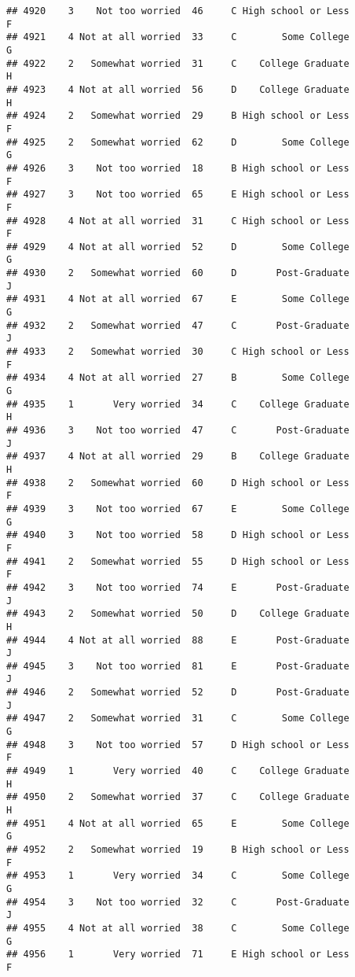 \documentclass[
]{article}
\begin{document}
\begin{verbatim}
## 4920    3    Not too worried  46     C High school or Less         F
## 4921    4 Not at all worried  33     C        Some College         G
## 4922    2   Somewhat worried  31     C    College Graduate         H
## 4923    4 Not at all worried  56     D    College Graduate         H
## 4924    2   Somewhat worried  29     B High school or Less         F
## 4925    2   Somewhat worried  62     D        Some College         G
## 4926    3    Not too worried  18     B High school or Less         F
## 4927    3    Not too worried  65     E High school or Less         F
## 4928    4 Not at all worried  31     C High school or Less         F
## 4929    4 Not at all worried  52     D        Some College         G
## 4930    2   Somewhat worried  60     D       Post-Graduate         J
## 4931    4 Not at all worried  67     E        Some College         G
## 4932    2   Somewhat worried  47     C       Post-Graduate         J
## 4933    2   Somewhat worried  30     C High school or Less         F
## 4934    4 Not at all worried  27     B        Some College         G
## 4935    1       Very worried  34     C    College Graduate         H
## 4936    3    Not too worried  47     C       Post-Graduate         J
## 4937    4 Not at all worried  29     B    College Graduate         H
## 4938    2   Somewhat worried  60     D High school or Less         F
## 4939    3    Not too worried  67     E        Some College         G
## 4940    3    Not too worried  58     D High school or Less         F
## 4941    2   Somewhat worried  55     D High school or Less         F
## 4942    3    Not too worried  74     E       Post-Graduate         J
## 4943    2   Somewhat worried  50     D    College Graduate         H
## 4944    4 Not at all worried  88     E       Post-Graduate         J
## 4945    3    Not too worried  81     E       Post-Graduate         J
## 4946    2   Somewhat worried  52     D       Post-Graduate         J
## 4947    2   Somewhat worried  31     C        Some College         G
## 4948    3    Not too worried  57     D High school or Less         F
## 4949    1       Very worried  40     C    College Graduate         H
## 4950    2   Somewhat worried  37     C    College Graduate         H
## 4951    4 Not at all worried  65     E        Some College         G
## 4952    2   Somewhat worried  19     B High school or Less         F
## 4953    1       Very worried  34     C        Some College         G
## 4954    3    Not too worried  32     C       Post-Graduate         J
## 4955    4 Not at all worried  38     C        Some College         G
## 4956    1       Very worried  71     E High school or Less         F

\end{verbatim}
\end{document}
